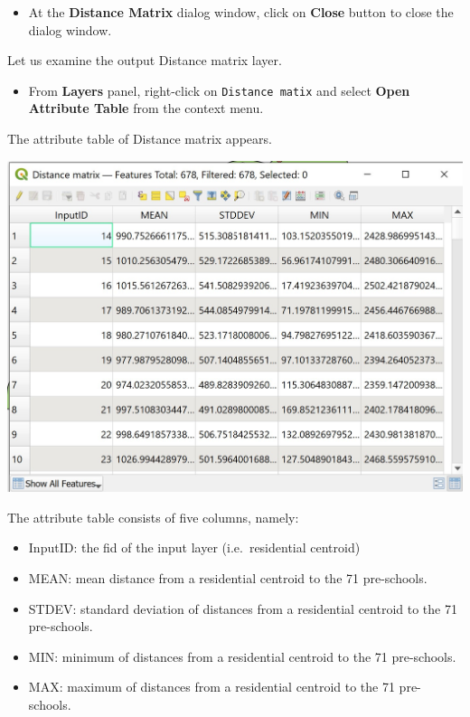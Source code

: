 \documentclass[
  letterpaper,
  DIV=11,
  numbers=noendperiod]{scrreprt}
\providecommand{\tightlist}{%
  \setlength{\itemsep}{0pt}\setlength{\parskip}{0pt}}\usepackage{longtable,booktabs,array}
\begin{document}
\begin{itemize}
\tightlist
\item
  At the \textbf{Distance Matrix} dialog window, click on \textbf{Close}
  button to close the dialog window.
\end{itemize}

Let us examine the output Distance matrix layer.

\begin{itemize}
\tightlist
\item
  From \textbf{Layers} panel, right-click on \texttt{Distance\ matix}
  and select \textbf{Open Attribute Table} from the context menu.
\end{itemize}

The attribute table of Distance matrix appears.

\includegraphics{./img04/image121.jpg}

The attribute table consists of five columns, namely:

\begin{itemize}
\item
  InputID: the fid of the input layer (i.e.~residential centroid)
\item
  MEAN: mean distance from a residential centroid to the 71 pre-schools.
\item
  STDEV: standard deviation of distances from a residential centroid to
  the 71 pre-schools.
\item
  MIN: minimum of distances from a residential centroid to the 71
  pre-schools.
\item
  MAX: maximum of distances from a residential centroid to the 71
  pre-schools.
\end{itemize}
\end{document}
